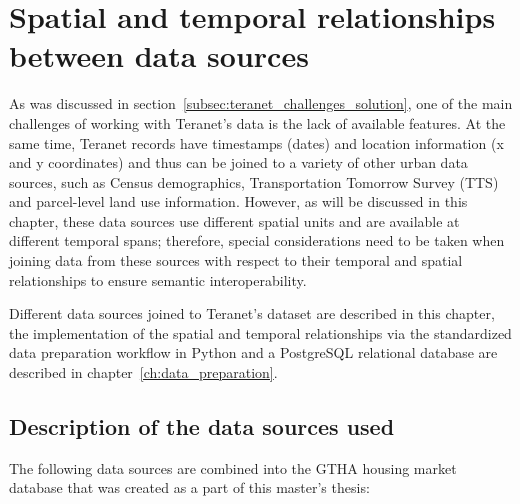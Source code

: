 \chapter{Spatial and temporal relationships between data sources} \label{ch:spatial_and_temporal_relationships}

As was discussed in section~\ref{subsec:teranet_challenges_solution}, one of the main challenges of working with Teranet's data is the lack of available features.
At the same time, Teranet records have timestamps (dates) and location information (x and y coordinates) and thus can be joined to a variety of other urban data sources, such as Census demographics, Transportation Tomorrow Survey (TTS) and parcel-level land use information.
However, as will be discussed in this chapter, these data sources use different spatial units and are available at different temporal spans;
therefore, special considerations need to be taken when joining data from these sources with respect to their temporal and spatial relationships to ensure semantic interoperability.

Different data sources joined to Teranet's dataset are described in this chapter, the implementation of the spatial and temporal relationships via the standardized data preparation workflow in Python and a PostgreSQL relational database are described in chapter~\ref{ch:data_preparation}.

\section{Description of the data sources used} \label{sec:description_of_data_sources}

The following data sources are combined into the GTHA housing market database that was created as a part of this master's thesis:

